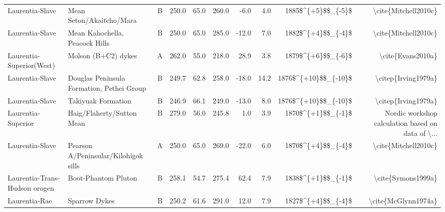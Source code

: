 \begin{longtable}{p{1 in}p{1 in}rrrrrrrr}
               Laurentia-Slave &                         Mean Seton/Akaitcho/Mara &      B &     250.0 &      65.0 & 260.0 &  -6.0 &       4.0 &     1885\$\textasciicircum \{+5\}\$\$\_\{-5\}\$ &                               \textbackslash cite\{Mitchell2010c\} \\
               Laurentia-Slave &                   Mean Kahochella, Peacock Hills &      B &     250.0 &      65.0 & 285.0 & -12.0 &       7.0 &     1882\$\textasciicircum \{+4\}\$\$\_\{-4\}\$ &                               \textbackslash cite\{Mitchell2010c\} \\
      Laurentia-Superior(West) &                              Molson (B+C2) dykes &      A &     262.0 &      55.0 & 218.0 &  28.9 &       3.8 &     1879\$\textasciicircum \{+6\}\$\$\_\{-6\}\$ &                                  \textbackslash cite\{Evans2010a\} \\
               Laurentia-Slave &        Douglas Peninsula Formation, Pethei Group &      B &     249.7 &      62.8 & 258.0 & -18.0 &      14.2 &   1876\$\textasciicircum \{+10\}\$\$\_\{-10\}\$ &                                \textbackslash citep\{Irving1979a\} \\
               Laurentia-Slave &                               Takiyuak Formation &      B &     246.9 &      66.1 & 249.0 & -13.0 &       8.0 &   1876\$\textasciicircum \{+10\}\$\$\_\{-10\}\$ &                                \textbackslash citep\{Irving1979a\} \\
            Laurentia-Superior &                       Haig/Flaherty/Sutton Mean  &      B &     279.0 &      56.0 & 245.8 &   1.0 &       3.9 &     1870\$\textasciicircum \{+1\}\$\$\_\{-1\}\$ &  Nordic workshop calculation based on data of \textbackslash ... \\
               Laurentia-Slave &             Pearson A/Peninsular/Kilohigok sills &      A &     250.0 &      65.0 & 269.0 & -22.0 &       6.0 &     1870\$\textasciicircum \{+4\}\$\$\_\{-4\}\$ &                               \textbackslash cite\{Mitchell2010c\} \\
 Laurentia-Trans-Hudson orogen &                              Boot-Phantom Pluton &      B &     258.1 &      54.7 & 275.4 &  62.4 &       7.9 &     1838\$\textasciicircum \{+1\}\$\$\_\{-1\}\$ &                                 \textbackslash cite\{Symons1999a\} \\
                 Laurentia-Rae &                                    Sparrow Dykes &      B &     250.2 &      61.6 & 291.0 &  12.0 &       7.9 &     1827\$\textasciicircum \{+4\}\$\$\_\{-4\}\$ &                                \textbackslash cite\{McGlynn1974a\} \\

\end{longtable}
